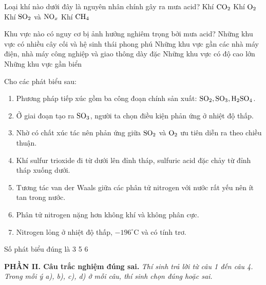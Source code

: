 \documentclass[12pt,a4paper]{article}
\begin{document}
\begin{ex}
Loại khí nào dưới đây là nguyên nhân chính gây ra mưa acid?
\choice
{Khí $\ce{CO2}$}
{Khí $\ce{O2}$}
{\True Khí $\ce{SO2}$ và $\ce{NO_x}$}
{Khí $\ce{CH4}$}

\end{ex}

\begin{ex}
Khu vực nào có nguy cơ bị ảnh hưởng nghiêm trọng bởi mưa acid?
\choice
{Những khu vực có nhiều cây cối và hệ sinh thái phong phú}
{\True Những khu vực gần các nhà máy điện, nhà máy công nghiệp và giao thông dày đặc}
{Những khu vực có độ cao lớn}
{Những khu vực gần biển}

\end{ex}

\begin{ex}
Cho các phát biểu sau:
\begin{enumerate}[(1)]
	\item Phương pháp tiếp xúc gồm ba công đoạn chính sản xuất: $\ce{SO2, SO3, H2SO4}$.
	\item Ở giai đoạn tạo ra $\ce{SO3}$, người ta chọn điều kiện phản ứng ở nhiệt độ thấp.
	\item Nhờ có chất xúc tác nên phản ứng giữa $\ce{SO2}$ và $\ce{O2}$ ưu tiên diễn ra theo chiều thuận.
	\item Khí sulfur trioxide đi từ dưới lên đỉnh tháp, sulfuric acid đặc chảy từ đỉnh tháp xuống dưới.
	\item Tương tác van der Waals giữa các phân tử nitrogen với nước rất yếu nên ít tan trong nước.
	\item Phân tử nitrogen nặng hơn không khí và không phân cực.
	\item Nitrogen lỏng ở nhiệt độ thấp, $-196^\circ\text{C}$ và có tính trơ.
\end{enumerate}
Số phát biểu đúng là
\choice
{3}
{}
{5}
{6}

\end{ex}


\vspace{0.3cm}
\noindent\textbf{\large PHẦN II. Câu trắc nghiệm đúng sai.}
\textit{Thí sinh trả lời từ câu 1 đến câu 4. Trong mỗi ý a), b), c), d) ở mỗi câu, thí sinh chọn đúng hoặc sai.}
\vspace{0.2cm}
\end{document}
